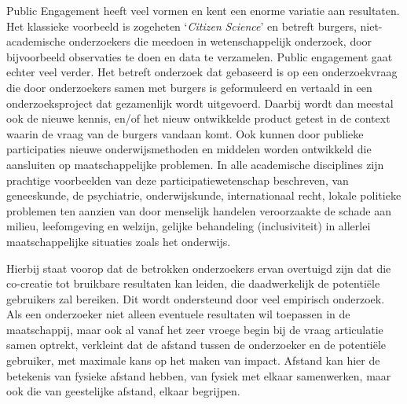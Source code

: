 \documentclass[smallauthor, chapterhaspagenum, nochapterinheader, pagenuminheader,  bigchapnum,medium2, tocpages,  garamond, titleinheader]{jote-book}
\begin{document}
	Public Engagement heeft veel vormen en kent een enorme variatie aan resultaten. Het klassieke voorbeeld is zogeheten ‘\emph{Citizen}\emph{ }\emph{Science}' en betreft burgers, niet-academische onderzoekers die meedoen in wetenschappelijk onderzoek, door bijvoorbeeld observaties te doen en data te verzamelen. Public engagement gaat echter veel verder. Het betreft onderzoek dat gebaseerd is op een onderzoekvraag die door onderzoekers samen met burgers is geformuleerd en vertaald in een onderzoeksproject dat gezamenlijk wordt uitgevoerd. Daarbij wordt dan meestal ook de nieuwe kennis, en/of het nieuw ontwikkelde product getest in de context waarin de vraag van de burgers vandaan komt. Ook kunnen door publieke participaties nieuwe onderwijsmethoden en middelen worden ontwikkeld die aansluiten op maatschappelijke problemen. In alle academische disciplines zijn prachtige voorbeelden van deze participatiewetenschap beschreven, van geneeskunde, de psychiatrie, onderwijskunde, internationaal recht, lokale politieke problemen ten aanzien van door menselijk handelen veroorzaakte de schade aan milieu, leefomgeving en welzijn, gelijke behandeling (inclusiviteit) in allerlei maatschappelijke situaties zoals het onderwijs.



	Hierbij staat voorop dat de betrokken onderzoekers ervan overtuigd zijn dat die co-creatie tot bruikbare resultaten kan leiden, die daadwerkelijk de potentiële gebruikers zal bereiken. Dit wordt ondersteund door veel empirisch onderzoek. Als een onderzoeker niet alleen eventuele resultaten wil toepassen in de maatschappij, maar ook al vanaf het zeer vroege begin bij de vraag articulatie samen optrekt, verkleint dat de afstand tussen de onderzoeker en de potentiële gebruiker, met maximale kans op het maken van impact. Afstand kan hier de betekenis van fysieke afstand hebben, van fysiek met elkaar samenwerken, maar ook die van geestelijke afstand, elkaar begrijpen.
\end{document}
